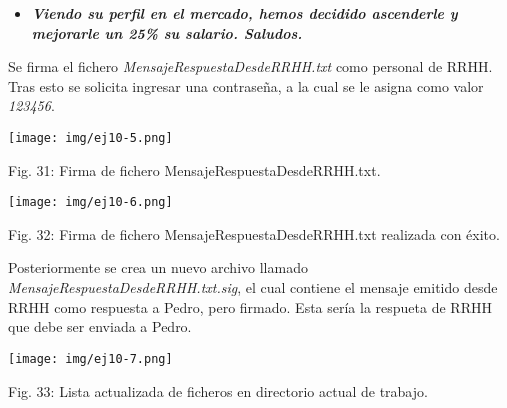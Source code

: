 \documentclass[12pt,oneside,a4paper]{book}
\begin{document}
\vspace{1em}

\begin{itemize}
    \item \textbf{\textit{Viendo su perfil en el mercado, hemos decidido ascenderle y mejorarle un 25\% su salario. Saludos.}}
\end{itemize}

\vspace{1em}

\hspace{20pt}
Se firma el fichero \textit{MensajeRespuestaDesdeRRHH.txt} como personal de RRHH. Tras esto se solicita ingresar una contraseña, a la cual se le asigna como valor \textit{123456}.

\vspace{2em}

\begin{center}
    \texttt{[image: img/ej10-5.png]}
    
\vspace{0.1em}
    
    Fig. 31: Firma de fichero MensajeRespuestaDesdeRRHH.txt.
\end{center}

\vspace{2em}

\begin{center}
    \texttt{[image: img/ej10-6.png]}
    
\vspace{0.1em}
    
    Fig. 32: Firma de fichero MensajeRespuestaDesdeRRHH.txt realizada con éxito.
\end{center}

\vspace{2em}

\hspace{20pt}
Posteriormente se crea un nuevo archivo llamado \textit{MensajeRespuestaDesdeRRHH.txt.sig}, el cual contiene el mensaje emitido desde RRHH como respuesta a Pedro, pero firmado. Esta sería la respueta de RRHH que debe ser enviada a Pedro.

\vspace{2em}

\begin{center}
    \texttt{[image: img/ej10-7.png]}
    
\vspace{0.1em}
    
    Fig. 33: Lista actualizada de ficheros en directorio actual de trabajo.
\end{center}
\end{document}
